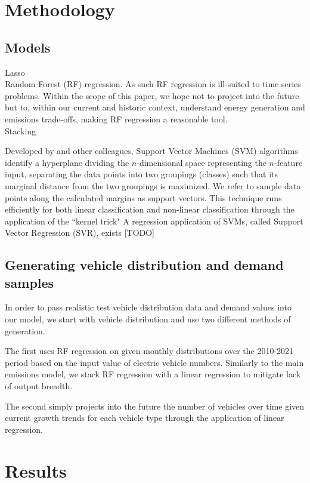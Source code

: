\documentclass{article}
\begin{document}
\section{Methodology}
\subsection{Models}
Lasso\\
Random Forest (RF) regression. As such RF regression is ill-suited to time series problems. Within the scope of this paper, we hope not to project into the future but to, within our current and historic context, understand energy generation and emissions trade-offs, making RF regression a reasonable tool.\\
Stacking

Developed by \cite{vapnik:svms} and other colleagues, Support Vector Machines (SVM) algorithms identify a hyperplane dividing the \(n\)-dimensional space representing the \(n\)-feature input, separating the data points into two groupings (classes) such that its marginal distance from the two groupings is maximized. We refer to sample data points along the calculated margins as support vectors. This technique runs efficiently for both linear classification and non-linear classification through the application of the ``kernel trick" A regression application of SVMs, called Support Vector Regression (SVR), exists [TODO]

\subsection{Generating vehicle distribution and demand samples}
In order to pass realistic test vehicle distribution data and demand values into our model, we start with vehicle distribution and use two different methods of generation.

The first uses RF regression on given monthly distributions over the 2010-2021 period based on the input value of electric vehicle numbers. Similarly to the main emissions model, we stack RF regression with a linear regression to mitigate lack of output breadth.

The second simply projects into the future the number of vehicles over time given current growth trends for each vehicle type through the application of linear regression.


\section{Results}
\end{document}
